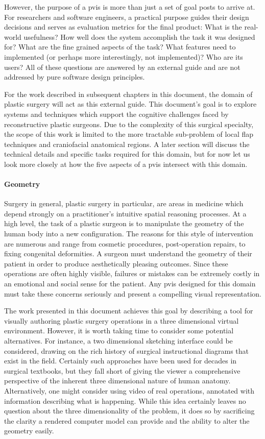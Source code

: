 However, the purpose of a \gls{pvis} is more than just a set of goal
posts to arrive at. For researchers and software engineers, a
practical purpose guides their design decisions and serves as
evaluation metrics for the final product: What is the real-world
usefulness? How well does the system accomplish the task it was designed for?
What are the fine grained aspects of the task? What features need to
implemented (or perhaps more interestingly, not implemented)? Who are
its users? All of these questions are answered by an external guide
and are not addressed by pure software design principles.

For the work described in subsequent chapters in this document, the
domain of plastic surgery will act as this external
guide. This document's goal is to explore systems and techniques which
support the cognitive challenges faced by reconstructive plastic
surgeons. Due to the complexity of this surgical specialty, the scope
of this work is limited to the more tractable sub-problem of local flap
techniques and craniofacial anatomical regions. A later section will
discuss the technical details and specific tasks required for this
domain, but for now let us look more closely at how the five aspects
of a \gls{pvis} intersect with this domain.

\paragraph{Geometry} Surgery in general, plastic surgery in
particular, are areas in medicine which depend strongly on a
practitioner's intuitive spatial reasoning processes. At a high level,
the task of a plastic surgeon is to manipulate the geometry of the
human body into a new configuration. The reasons for this style of
intervention are numerous and range from cosmetic procedures,
post-operation repairs, to fixing congenital
deformities. A surgeon must understand the geometry of their patient
in order to produce aesthetically pleasing outcomes. Since these
operations are often highly visible, failures or mistakes can be
extremely costly in an emotional and social sense for the patient. Any
\gls{pvis} designed for this domain must take these concerns seriously
and present a compelling visual representation.

The work presented in this document achieves this goal by describing a
tool for visually authoring plastic surgery operations in a three
dimensional virtual environment. However, it is worth taking time to consider
some potential alternatives. For instance, a two dimensional sketching
interface could be considered, drawing on the rich history of surgical
instructional diagrams that exist in the field. Certainly such
approaches have been used for decades in surgical textbooks, but they
fall short of giving the viewer a comprehensive perspective of the
inherent three dimensional nature of human anatomy. Alternatively, one
might consider using video of real operations, annotated with
information describing what is happening. While this idea certainly
leaves no question about the three dimensionality of the problem, it
does so by sacrificing the clarity a rendered computer model can
provide and the ability to alter the geometry easily.

